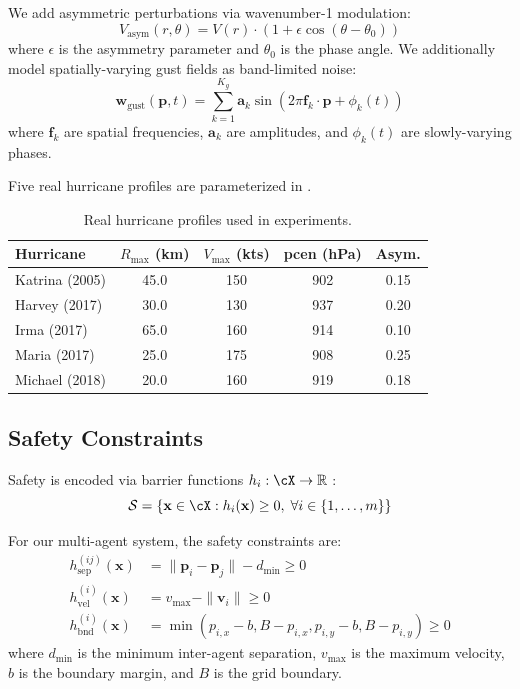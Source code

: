 \documentclass[12pt,a4paper,twocolumn]{article}
\newcommand{\cS}{\mathcal{S}}
\newcommand{\R}{\mathbb{R}}
\newcommand{\vect}[1]{\mathbf{#1}}
\begin{document}
We add asymmetric perturbations via wavenumber-1 modulation:
\begin{equation}
    V_{\text{asym}}(r, \theta) = V(r) \cdot (1 + \epsilon \cos(\theta - \theta_0))
\end{equation}
where $\epsilon$ is the asymmetry parameter and $\theta_0$ is the phase angle. We additionally model spatially-varying gust fields as band-limited noise:
\begin{equation}
    \vect{w}_{\text{gust}}(\vect{p}, t) = \sum_{k=1}^{K_g} \vect{a}_k \sin(2\pi \vect{f}_k \cdot \vect{p} + \phi_k(t))
\end{equation}
where $\vect{f}_k$ are spatial frequencies, $\vect{a}_k$ are amplitudes, and $\phi_k(t)$ are slowly-varying phases.

Five real hurricane profiles are parameterized in .

\begin{table}[t]
\centering
\caption{Real hurricane profiles used in experiments.}
\label{tab:hurricanes}
\small
\begin{tabular}{lcccc}
\toprule
\textbf{Hurricane} & \textbf{$R_{\max}$ (km)} & \textbf{$V_{\max}$ (kts)} & \textbf{pcen (hPa)} & \textbf{Asym.} \\
\midrule
Katrina (2005) & 45.0 & 150 & 902 & 0.15 \\
Harvey (2017) & 30.0 & 130 & 937 & 0.20 \\
Irma (2017) & 65.0 & 160 & 914 & 0.10 \\
Maria (2017) & 25.0 & 175 & 908 & 0.25 \\
Michael (2018) & 20.0 & 160 & 919 & 0.18 \\
\bottomrule
\end{tabular}
\end{table}

\subsection{Safety Constraints}
\label{sec:safety_prelim}

Safety is encoded via barrier functions $h_i : \cX \to \R$ \citep{Ames2014}:
\begin{equation}
    \cS = \{\vect{x} \in \cX : h_i(\vect{x}) \geq 0, \;\forall i \in \{1, \ldots, m\}\}
    \label{eq:safe_set}
\end{equation}

For our multi-agent system, the safety constraints are:
\begin{align}
    h_{\text{sep}}^{(ij)}(\vect{x}) &= \|\vect{p}_i - \vect{p}_j\| - d_{\min} \geq 0 \label{eq:sep} \\
    h_{\text{vel}}^{(i)}(\vect{x}) &= v_{\max} - \|\vect{v}_i\| \geq 0 \label{eq:vel} \\
    h_{\text{bnd}}^{(i)}(\vect{x}) &= \min(p_{i,x} - b, B - p_{i,x}, p_{i,y} - b, B - p_{i,y}) \geq 0 \label{eq:bnd}
\end{align}
where $d_{\min}$ is the minimum inter-agent separation, $v_{\max}$ is the maximum velocity, $b$ is the boundary margin, and $B$ is the grid boundary.
\end{document}
